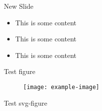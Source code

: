 \begin{frame}{New Slide}
\protect\hypertarget{new-slide-2}{}
\begin{itemize}
\tightlist
\item
  This is some content
\item
  This is some content
\item
  This is some content
\end{itemize}
\end{frame}

\begin{frame}{Test figure}
\protect\hypertarget{test-figure}{}
\begin{figure}
    \texttt{[image: example-image]}
\end{figure}
\end{frame}

\begin{frame}{Test svg-figure}
\protect\hypertarget{test-svg-figure}{}
\begin{figure}
    \def\svgwidth{.7\textwidth}
    \small{}
\end{figure}
\end{frame}
